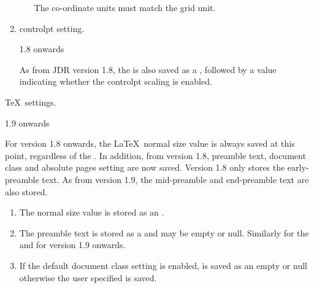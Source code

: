 \begin{numbered}
\begin{enumerate}
\begin{enumerate}
     The co-ordinate units must match the grid unit.

    \end{enumerate}

    \item \Gls{controlpt} setting.
  \begin{jdrversion}{1.8 onwards}
  \begin{syntaxline}
   
  \end{syntaxline}
  As from JDR version 1.8, the  is also saved as a
  , followed by a  value 
  indicating whether the \gls{controlpt} scaling is enabled.
  \end{jdrversion}

  \end{enumerate}%

\item\label{jdr:imagetex}\TeX\ settings.
\begin{jdrversion}{1.9 onwards}
\begin{syntaxline}
  
 
\end{syntaxline}
\end{jdrversion}
\begin{jdrversion}{1.8}
\begin{syntaxline}
  
\end{syntaxline}
\end{jdrversion}
For version 1.8 onwards, the \LaTeX\ normal size value is always
saved at this point, regardless of the
\hyperref[jdr:settings-id]{}.  In addition, from
version 1.8, preamble text, document class and absolute pages
setting are now saved. Version 1.8 only stores the early-preamble
text.  As from version 1.9, the mid-preamble and end-preamble text
are also stored.
\begin{enumerate}
\item The normal size value  is stored as an .

\item The preamble text  is stored as a 
and may be empty or null. Similarly for the 
and  for version 1.9 onwards.

\item If the default document class setting is enabled,  is saved as an empty or null  otherwise the user
specified  is saved.


\end{enumerate}
\end{numbered}
